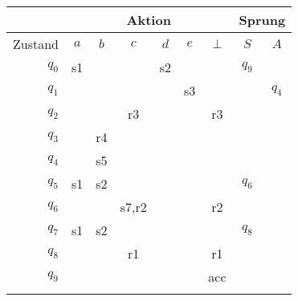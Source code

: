 \documentclass[border=0.2cm, convert={density=600}]{standalone}
\begin{document}

\begin{tabular}{|r|cccccc|cc|}
	\hline\rowcolor{lightgray}
	& \multicolumn{6}{c|}{Aktion} & \multicolumn{2}{c|}{Sprung}\\
	\hline\rowcolor{lightgray}
	Zustand & $a$ & $b$ & $c$ & $d$ & $e$ & $\bot$ &  $S$  &  $A$ \\
	\hline\rowcolor{lightergray}
	$q_0$ & s1 &    &       & s2 &    &     & $q_9$ &      \\ \rowcolor{lightgray}
	$q_1$ &    &    &       &    & s3 &     &       & $q_4$\\ \rowcolor{lightergray}
	$q_2$ &    &    &   r3  &    &    & r3  &       &      \\ \rowcolor{lightgray}
	$q_3$ &    & r4 &       &    &    &     &       &      \\ \rowcolor{lightergray}
	$q_4$ &    & s5 &       &    &    &     &       &      \\ \rowcolor{lightgray}
	$q_5$ & s1 & s2 &       &    &    &     & $q_6$ &      \\ \rowcolor{lightergray}
	$q_6$ &    &    & s7,r2 &    &    & r2  &       &      \\ \rowcolor{lightgray}
	$q_7$ & s1 & s2 &       &    &    &     & $q_8$ &      \\ \rowcolor{lightergray}
	$q_8$ &    &    &   r1  &    &    & r1  &       &      \\ \rowcolor{lightgray}
	$q_9$ &    &    &       &    &    & acc &       &      \\ \rowcolor{lightergray}
	\hline
\end{tabular}
\end{document}
